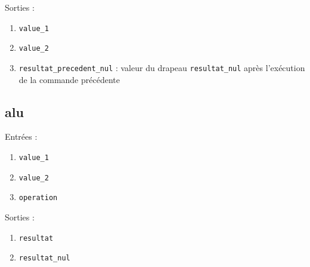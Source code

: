 \documentclass{article}
\begin{document}
Sorties : 
\begin{enumerate}
    \item \texttt{value\_1}
    \item \texttt{value\_2}
    \item \texttt{resultat\_precedent\_nul} : valeur du drapeau \texttt{resultat\_nul} après l’exécution de la commande précédente
\end{enumerate}

\subsection{alu}
Entrées :
    \begin{enumerate}
        \item \texttt{value\_1}
        \item \texttt{value\_2}
        \item \texttt{operation}
        
    \end{enumerate}

Sorties :
    \begin{enumerate}
        \item \texttt{resultat}
        \item \texttt{resultat\_nul}
    \end{enumerate}
\end{document}
